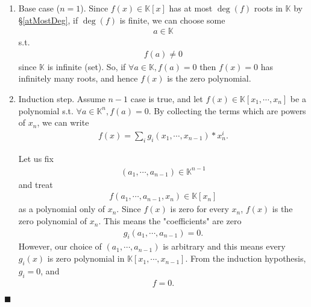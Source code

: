 \documentclass[11pt]{book}
\begin{document}
\begin{enumerate}
\item Base case ($n=1$).
Since $f(x) \in \mathbb{K}[x]$ has at most $\deg(f)$ roots in $\mathbb{K}$ by \S\ref{atMostDeg}, if $\deg(f)$ is finite, we can choose some
\begin{eqnarray}
a \in \mathbb{K}
\end{eqnarray}
s.t.
\begin{eqnarray}
f(a) \neq 0
\end{eqnarray}
since $\mathbb{K}$ is infinite (set).
So, if $\forall a \in \mathbb{K}, f(a) = 0$ then $f(x)=0$ has infinitely many roots, and hence $f(x)$ is the zero polynomial.

\item Induction step.
Assume $n-1$ case is true, and let $f(x) \in \mathbb{K}[x_1, \cdots, x_n]$ be a polynomial s.t. $\forall a \in \mathbb{K}^n, f(a) = 0$.
By collecting the terms which are powers of $x_n$, we can write
\begin{eqnarray}
f(x) = \sum_{i} g_i (x_1, \cdots, x_{n-1}) * x_n^i.
\end{eqnarray}

Let us fix
\begin{eqnarray}
(a_1, \cdots, a_{n-1}) \in \mathbb{K}^{n-1}
\end{eqnarray}
and treat
\begin{eqnarray}
f(a_1, \cdots, a_{n-1}, x_n) \in \mathbb{K}[x_n] 
\end{eqnarray}
as a polynomial only of $x_n$.
Since $f(x)$ is zero for every $x_n$, $f(x)$ is the zero polynomial of $x_n$.
This means the "coefficients" are zero
\begin{eqnarray}
g_i (a_1, \cdots, a_{n-1}) = 0.
\end{eqnarray}
However, our choice of $(a_1, \cdots, a_{n-1})$ is arbitrary and this means every $g_i(x)$ is zero polynomial in $\mathbb{K}[x_1, \cdots, x_{n-1}]$.
From the induction hypothesis, $g_i = 0$, and
\begin{eqnarray}
f = 0.
\end{eqnarray}
\end{enumerate}

$\blacksquare$

\end{document}
